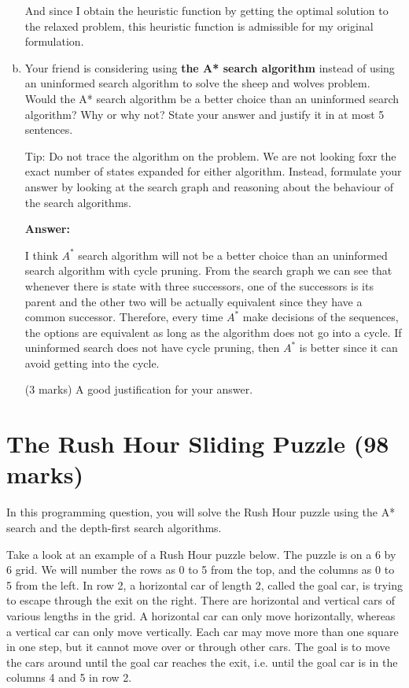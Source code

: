 \documentclass[12pt]{article}
\begin{document}
\begin{enumerate}[(a)]
And since I obtain the heuristic function by getting the optimal solution to the relaxed problem, this heuristic function is admissible for my original formulation.




\item
Your friend is considering using {\bf the A* search algorithm} instead of using an uninformed search algorithm to solve the sheep and wolves problem. Would the A* search algorithm be a better choice than an uninformed search algorithm? Why or why not? State your answer and justify it in at most 5 sentences.

Tip: Do not trace the algorithm on the problem. We are not looking foxr the exact number of states expanded for either algorithm. Instead, formulate your answer by looking at the search graph and reasoning about the behaviour of the search algorithms.

{\bf Answer:}

I think $A^{*}$ search algorithm will not be a better choice than an uninformed search algorithm with cycle pruning. From the search graph we can see that whenever there is state with three successors, one of the successors is its parent and the other two will be actually equivalent since they have a common successor. Therefore, every time $A^{*}$ make decisions of the sequences, the options are equivalent as long as the algorithm does not go into a cycle. If uninformed search does not have cycle pruning, then $A^{*}$ is better since it can avoid getting into the cycle.

\begin{markscheme}
(3 marks) A good justification for your answer.
\end{markscheme}


\end{enumerate}



\newpage
\section{The Rush Hour Sliding Puzzle (98 marks)}

In this programming question, you will solve the Rush Hour puzzle using the A* search and the depth-first search algorithms.

Take a look at an example of a Rush Hour puzzle below. The puzzle is on a 6 by 6 grid. We will number the rows as 0 to 5 from the top, and the columns as 0 to 5 from the left. In row 2, a horizontal car of length 2, called the goal car, is trying to escape through the exit on the right. There are horizontal and vertical cars of various lengths in the grid. A horizontal car can only move horizontally, whereas a vertical car can only move vertically. Each car may move more than one square in one step, but it cannot move over or through other cars. The goal is to move the cars around until the goal car reaches the exit, i.e. until the goal car is in the columns 4 and 5 in row 2. 
\end{document}
